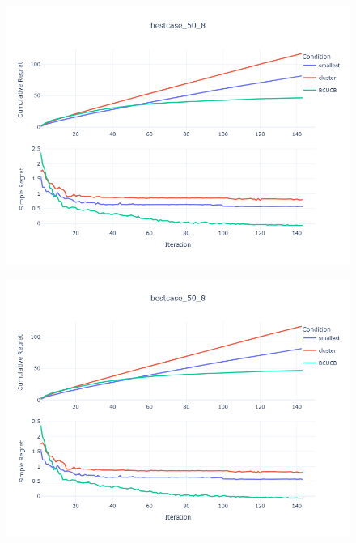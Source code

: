 \documentclass[opre,sglanonrev]{informs4}
\begin{document}
\begin{figure}[htbp]
    \centering
    \begin{minipage}[t]{0.48\textwidth}
        \centering
        \includegraphics[width=\textwidth]{figures/best_50_8.png}
        \label{}
    \end{minipage}
    \hfill
    \begin{minipage}[t]{0.48\textwidth}
        \centering
        \includegraphics[width=\textwidth]{figures/best_50_16.png}
        \label{}
    \end{minipage}
    \begin{minipage}[t]{0.48\textwidth}
        \centering

\end{minipage}
\end{figure}
\end{document}
